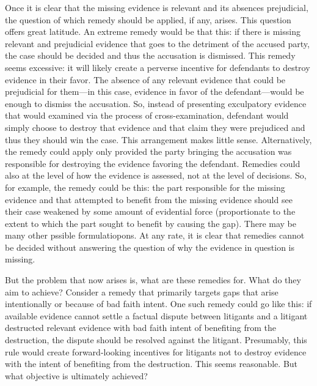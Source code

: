 \documentclass[
  10pt,
  dvipsnames,enabledeprecatedfontcommands]{scrartcl}
\begin{document}
Once it is clear that the missing evidence is relevant and its absences
prejudicial, the question of which remedy should be applied, if any,
arises. This question offers great latitude. An extreme remedy would be
that this: if there is missing relevant and prejudicial evidence that
goes to the detriment of the accused party, the case should be decided
and thus the accusation is dismissed. This remedy seems excessive: it
will likely create a perverse incentive for defendants to destroy
evidence in their favor. The absence of any relevant evidence that could
be prejudicial for them---in this case, evidence in favor of the
defendant---would be enough to dismiss the accusation. So, instead of
presenting exculpatory evidence that would examined via the process of
cross-examination, defendant would simply choose to destroy that
evidence and that claim they were prejudiced and thus they should win
the case. This arrangement makes little sense. Alternatively, the remedy
could apply only provided the party bringing the accusation was
responsible for destroying the evidence favoring the defendant. Remedies
could also at the level of how the evidence is assessed, not at the
level of decisions. So, for example, the remedy could be this: the part
responsible for the missing evidence and that attempted to benefit from
the missing evidence should see their case weakened by some amount of
evidential force (proportionate to the extent to which the part sought
to benefit by causing the gap). There may be many other pssible
formulatiopons. At any rate, it is clear that remedies cannot be decided
without answering the question of why the evidence in question is
missing.

But the problem that now arises is, what are these remedies for. What do
they aim to achieve? Consider a remedy that primarily targets gaps that
arise intentionally or because of bad faith intent. One such remedy
could go like this: if available evidence cannot settle a factual
dispute between litigants and a litigant destructed relevant evidence
with bad faith intent of benefiting from the destruction, the dispute
should be resolved against the litigant. Presumably, this rule would
create forward-looking incentives for litigants not to destroy evidence
with the intent of benefiting from the destruction. This seems
reasonable. But what objective is ultimately achieved?
\end{document}
